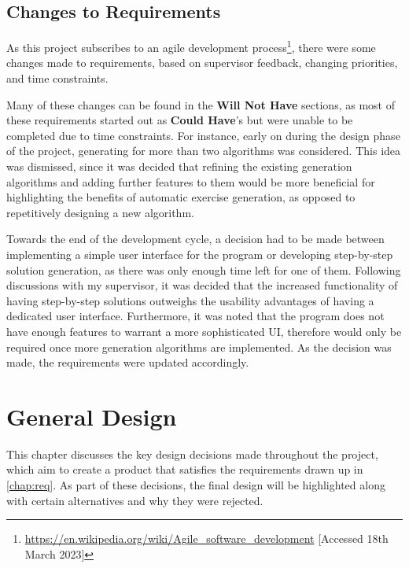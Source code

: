 \documentclass{l4proj}
\begin{document}
\section{Changes to Requirements}

As this project subscribes to an agile development process\footnote{\url{https://en.wikipedia.org/wiki/Agile_software_development} [Accessed 18th March 2023]}, there were some changes made to requirements, based on supervisor feedback, changing priorities, and time constraints.

Many of these changes can be found in the \textbf{Will Not Have} sections, as most of these requirements started out as \textbf{Could Have}'s but were unable to be completed due to time constraints. For instance, early on during the design phase of the project, generating for more than two algorithms was considered. This idea was dismissed, since it was decided that refining the existing generation algorithms and adding further features to them would be more beneficial for highlighting the benefits of automatic exercise generation, as opposed to repetitively designing a new algorithm. 

Towards the end of the development cycle, a decision had to be made between implementing a simple user interface for the program or developing step-by-step solution generation, as there was only enough time left for one of them. Following discussions with my supervisor, it was decided that the increased functionality of having step-by-step solutions outweighs the usability advantages of having a dedicated user interface. Furthermore, it was noted that the program does not have enough features to warrant a more sophisticated UI, therefore would only be required once more generation algorithms are implemented. As the decision was made, the requirements were updated accordingly.


\chapter{General Design}
\label{chap:des}

This chapter discusses the key design decisions made throughout the project, which aim to create a product that satisfies the requirements drawn up in \autoref{chap:req}. As part of these decisions, the final design will be highlighted along with certain alternatives and why they were rejected.
\end{document}

